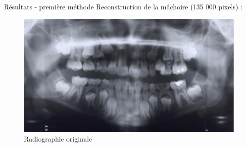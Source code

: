 \documentclass{beamer}
\begin{document}
\begin{frame}{Résultats - première méthode}
    Reconstruction de la mâchoire (135 000 pixels) : 
    \begin{figure}[t]
        \centering
        \includegraphics[scale = 0.35]{radio_dent.jpeg}
        \caption{Radiographie originale}
    \end{figure}
\end{frame}
\end{document}
